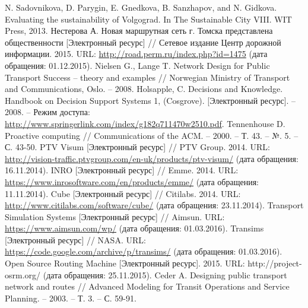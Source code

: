 \renewcommand{\bibname}{%
    \vspace{-2em}\begin{center}
        Список используемой литературы
    \end{center}\vspace{-2em}
}

\pagestyle{empty}

\begin{thebibliography}{10}
     N. Sadovnikova, D. Parygin, E. Gnedkova, B. Sanzhapov, and N. Gidkova. 
        Evaluating the sustainability of Volgograd. In The Sustainable City VIII. WIT Press, 2013.
     Нестерова А. Новая маршрутная сеть г. Томска представлена общественности 
        [Электронный ресурс] // Сетевое издание Центр дорожной информации. 2015. URL: 
        \url{http://road.perm.ru/index.php?id=1475} (дата обращения: 01.12.2015).
     Nielsen G., Lange T. Network Design for Public Transport Success -- theory and 
        examples // Norwegian Ministry of Transport and Communications, Oslo. -- 2008.
     Holsapple, C. Decisions and Knowledge. Handbook on Decision Support Systems 1, 
        (Cosgrove). [Электронный ресурс]. -- 2008. -- Режим доступа: 
        \url{http://www.springerlink.com/index/g182q711470w2510.pdf}.
     Tennenhouse D. Proactive computing //
        Communications of the ACM. -- 2000. -- Т. 43. -- №. 5. -- С. 43-50.
     PTV Visum [Электронный ресурс] // PTV Group. 2014. URL: 
        \url{http://vision-traffic.ptvgroup.com/en-uk/products/ptv-visum/} 
        (дата обращения: 16.11.2014).
     INRO [Электронный ресурс] // Emme. 2014. URL: 
        \url{https://www.inrosoftware.com/en/products/emme/} (дата обращения: 11.11.2014).
     Cube [Электронный ресурс] // Citilabs. 2014. URL: 
        \url{http://www.citilabs.com/software/cube/} (дата обращения: 23.11.2014).
     Transport Simulation Systems [Электронный ресурс] // Aimsun. URL: 
        \url{https://www.aimsun.com/wp/} (дата обращения: 01.03.2016).
     Transims [Электронный ресурс] // NASA. URL: 
        \url{https://code.google.com/archive/p/transims/} (дата обращения: 01.03.2016).
     Open Source Routing Machine [Электронный ресурс]. 2015. URL: http://project-osrm.org/ 
        (дата обращения: 25.11.2015).
     Ceder A. Designing public transport network and routes //
        Advanced Modeling for Transit Operations and Service Planning. -- 2003. -- Т. 3. -- С. 59-91.

\end{thebibliography}

